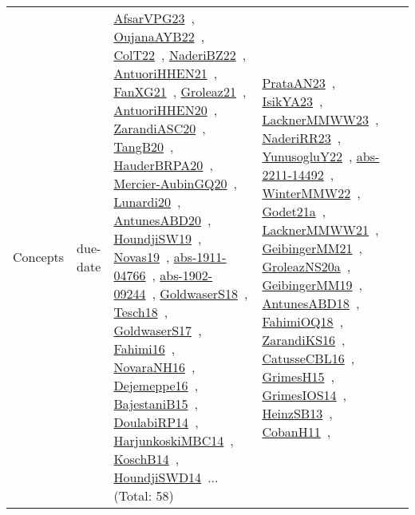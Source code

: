 {\begin{longtable}{lp{3cm}>{\raggedright\arraybackslash}p{6cm}>{\raggedright\arraybackslash}p{6cm}>{\raggedright\arraybackslash}p{8cm}}
Concepts & due-date & \href{../works/AfsarVPG23.pdf}{AfsarVPG23}~\cite{AfsarVPG23}, \href{../works/OujanaAYB22.pdf}{OujanaAYB22}~\cite{OujanaAYB22}, \href{../works/ColT22.pdf}{ColT22}~\cite{ColT22}, \href{../works/NaderiBZ22.pdf}{NaderiBZ22}~\cite{NaderiBZ22}, \href{../works/AntuoriHHEN21.pdf}{AntuoriHHEN21}~\cite{AntuoriHHEN21}, \href{../works/FanXG21.pdf}{FanXG21}~\cite{FanXG21}, \href{../works/Groleaz21.pdf}{Groleaz21}~\cite{Groleaz21}, \href{../works/AntuoriHHEN20.pdf}{AntuoriHHEN20}~\cite{AntuoriHHEN20}, \href{../works/ZarandiASC20.pdf}{ZarandiASC20}~\cite{ZarandiASC20}, \href{../works/TangB20.pdf}{TangB20}~\cite{TangB20}, \href{../works/HauderBRPA20.pdf}{HauderBRPA20}~\cite{HauderBRPA20}, \href{../works/Mercier-AubinGQ20.pdf}{Mercier-AubinGQ20}~\cite{Mercier-AubinGQ20}, \href{../works/Lunardi20.pdf}{Lunardi20}~\cite{Lunardi20}, \href{../works/AntunesABD20.pdf}{AntunesABD20}~\cite{AntunesABD20}, \href{../works/HoundjiSW19.pdf}{HoundjiSW19}~\cite{HoundjiSW19}, \href{../works/Novas19.pdf}{Novas19}~\cite{Novas19}, \href{../works/abs-1911-04766.pdf}{abs-1911-04766}~\cite{abs-1911-04766}, \href{../works/abs-1902-09244.pdf}{abs-1902-09244}~\cite{abs-1902-09244}, \href{../works/GoldwaserS18.pdf}{GoldwaserS18}~\cite{GoldwaserS18}, \href{../works/Tesch18.pdf}{Tesch18}~\cite{Tesch18}, \href{../works/GoldwaserS17.pdf}{GoldwaserS17}~\cite{GoldwaserS17}, \href{../works/Fahimi16.pdf}{Fahimi16}~\cite{Fahimi16}, \href{../works/NovaraNH16.pdf}{NovaraNH16}~\cite{NovaraNH16}, \href{../works/Dejemeppe16.pdf}{Dejemeppe16}~\cite{Dejemeppe16}, \href{../works/BajestaniB15.pdf}{BajestaniB15}~\cite{BajestaniB15}, \href{../works/DoulabiRP14.pdf}{DoulabiRP14}~\cite{DoulabiRP14}, \href{../works/HarjunkoskiMBC14.pdf}{HarjunkoskiMBC14}~\cite{HarjunkoskiMBC14}, \href{../works/KoschB14.pdf}{KoschB14}~\cite{KoschB14}, \href{../works/HoundjiSWD14.pdf}{HoundjiSWD14}~\cite{HoundjiSWD14}... (Total: 58) & \href{../works/PrataAN23.pdf}{PrataAN23}~\cite{PrataAN23}, \href{../works/IsikYA23.pdf}{IsikYA23}~\cite{IsikYA23}, \href{../works/LacknerMMWW23.pdf}{LacknerMMWW23}~\cite{LacknerMMWW23}, \href{../works/NaderiRR23.pdf}{NaderiRR23}~\cite{NaderiRR23}, \href{../works/YunusogluY22.pdf}{YunusogluY22}~\cite{YunusogluY22}, \href{../works/abs-2211-14492.pdf}{abs-2211-14492}~\cite{abs-2211-14492}, \href{../works/WinterMMW22.pdf}{WinterMMW22}~\cite{WinterMMW22}, \href{../works/Godet21a.pdf}{Godet21a}~\cite{Godet21a}, \href{../works/LacknerMMWW21.pdf}{LacknerMMWW21}~\cite{LacknerMMWW21}, \href{../works/GeibingerMM21.pdf}{GeibingerMM21}~\cite{GeibingerMM21}, \href{../works/GroleazNS20a.pdf}{GroleazNS20a}~\cite{GroleazNS20a}, \href{../works/GeibingerMM19.pdf}{GeibingerMM19}~\cite{GeibingerMM19}, \href{../works/AntunesABD18.pdf}{AntunesABD18}~\cite{AntunesABD18}, \href{../works/FahimiOQ18.pdf}{FahimiOQ18}~\cite{FahimiOQ18}, \href{../works/ZarandiKS16.pdf}{ZarandiKS16}~\cite{ZarandiKS16}, \href{../works/CatusseCBL16.pdf}{CatusseCBL16}~\cite{CatusseCBL16}, \href{../works/GrimesH15.pdf}{GrimesH15}~\cite{GrimesH15}, \href{../works/GrimesIOS14.pdf}{GrimesIOS14}~\cite{GrimesIOS14}, \href{../works/HeinzSB13.pdf}{HeinzSB13}~\cite{HeinzSB13}, \href{../works/CobanH11.pdf}{CobanH11}~\cite{CobanH11}, 
\end{longtable}}
